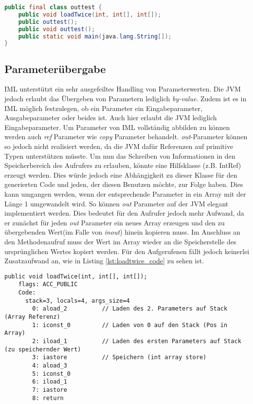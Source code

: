 \begin{lstlisting}[caption=Struktur der erzeugten Java-Klasse,language=Java,label={lst:outtest_class}]
public final class outtest {
    public void loadTwice(int, int[], int[]);
    public outtest();
    public void outtest();
    public static void main(java.lang.String[]);
}
\end{lstlisting}


\subsection {Parameterübergabe}

IML unterstützt ein sehr ausgefeiltes Handling von Parameterwerten. Die JVM jedoch erlaubt 
das Übergeben von Parametern lediglich \textit{by-value}. Zudem ist es in IML möglich 
festzulegen, ob ein Parameter ein Eingabeparameter, Ausgabeparameter oder beides ist. Auch hier 
erlaubt die JVM lediglich Eingabeparameter. Um Parameter von IML vollständig abbilden zu können 
werden auch \textit{ref} Parameter wie \textit{copy} Parameter behandelt. \textit{out}-Parameter 
können so jedoch nicht realisiert werden, da die JVM dafür Referenzen auf primitive Typen 
unterstützen müsste. Um nun das Schreiben von Informationen in den Speicherbereich des Aufrufers
zu erlauben, könnte eine Hilfsklasse (z.B. IntRef) erzeugt werden. Dies würde jedoch eine 
Abhängigkeit zu dieser Klasse für den generierten Code und jeden, der diesen Benutzen möchte, 
zur Folge haben. Dies kann umgangen werden, wenn der entsprechende Parameter in ein Array mit
der Länge 1 umgewandelt wird. So können \textit{out} Parameter auf der JVM elegant implementiert werden.
Dies bedeutet für den Aufrufer jedoch mehr Aufwand, da er zunächst für jeden \textit{out} Parameter 
ein neues Array erzeugen und den zu übergebenden Wert(im Falle von \textit{inout}) hinein kopieren muss. 
Im Anschluss an den Methodenaufruf muss der Wert im Array wieder an die Speicherstelle des ursprünglichen 
Wertes kopiert werden. Für den Aufgerufenen fällt jedoch keinerlei Zusatzaufwand an, wie in Listing 
\ref{lst:loadtwice_code} zu sehen ist.
\newline

\begin{lstlisting}[caption=Bytecode der loadTwice Prozedur ohne conditions,label={lst:loadtwice_code}]
public void loadTwice(int, int[], int[]);
    flags: ACC_PUBLIC
    Code:
      stack=3, locals=4, args_size=4
        0: aload_2          // Laden des 2. Parameters auf Stack (Array Referenz)
        1: iconst_0         // Laden von 0 auf den Stack (Pos in Array)
        2: iload_1          // Laden des ersten Parameters auf Stack (zu speichernder Wert)
        3: iastore          // Speichern (int array store)
        4: aload_3       
        5: iconst_0      
        6: iload_1       
        7: iastore       
        8: return
\end{lstlisting}



